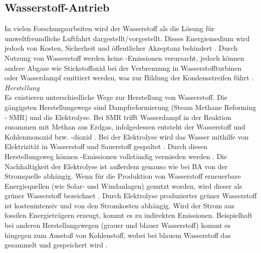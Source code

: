 \subsection{Wasserstoff-Antrieb}
\label{Wasserstoff-Antrieb}

In vielen Forschungsarbeiten wird der Wasserstoff als die Lösung für umweltfreundliche Luftfahrt dargestellt/vorgestellt.
Dieses Energiemedium wird jedoch von Kosten, Sicherheit und öffentlicher Akzeptanz behindert \cite{ansell2023review}.
Durch Nutzung von Wasserstoff werden keine -Emissionen verursacht, jedoch können andere Abgase 
wie Stickstoffoxid  bei der Verbrennung in Wasserstoffturbinen oder Wasserdampf emittiert werden, was zur Bildung der Kondensstreifen
führt \cite{hepperle2012electric}.
%
\textit{Herstellung}\\
Es existieren unterschiedliche Wege zur Herstellung von Wasserstoff. 
Die gängigsten Herstellungswege sind Dampfreformierung (Steam Methane Reforming - SMR) und die Elektrolyse. %
Bei SMR trifft Wasserdampf in der Reaktion zusammen mit Methan aus Erdgas, infolgedessen entsteht der
Wasserstoff  und Kohlenmonoxid  bzw. -dioxid \cite{mulder2019outlook}. Bei der Elektrolyse wird das Wasser mithilfe von Elektrizität 
in Wasserstoff  und Sauerstoff  gespaltet \cite{mulder2019outlook}. Durch diesen Herstellungsweg können -Emissionen 
vollständig vermieden werden \cite{dalmia2022powering}. 
Die Nachhaltigkeit der Elektrolyse ist außerdem genauso wie bei BA von der Stromquelle abhängig.
%
Wenn für die Produktion von Wasserstoff erneuerbare Energiequellen (wie Solar- und Windanlagen) genutzt worden, 
wird dieser als grüner Wasserstoff bezeichnet \cite{mulder2019outlook}. 
Durch Elektrolyse produzierter grüner Wasserstoff ist kostenintensiv \cite{dalmia2022powering} und von den Stromkosten abhängig. 
Wird der Strom aus fossilen Energieträgern erzeugt, kommt es zu indirekten Emissionen.
Beispielhaft bei anderen Herstellungswegen (grauer und blauer Wasserstoff)
kommt es hingegen zum Ausstoß von Kohlenstoff, wobei bei blauem Wasserstoff das  gesammelt und gespeichert wird \cite{mulder2019outlook}.

